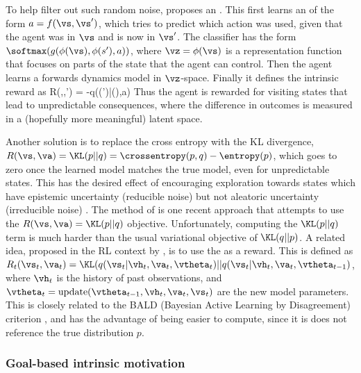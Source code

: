 To help filter out such random noise,
\citep{Pathak2017} proposes an
.
This first learns  an 
of the form $a = f(\vs,\vs')$, which tries
to predict which action was used, given
that the agent was in $\vs$ and is now in $\vs'$.
The classifier has the form
$\softmax(g(\phi(\vs), \phi(s'), a))$,
where $\vz=\phi(\vs)$ is  a representation function
that focuses  on parts of the state that the agent can control.
Then the agent learns a forwards dynamics model
in $\vz$-space.
Finally it defines the intrinsic reward as
\be
R(\vs,\va,\vs') = -\log q(\phi(\vs')|\phi(\vs),a)
\ee
Thus the agent is rewarded for visiting states that lead
to unpredictable consequences,
where the difference in outcomes is measured
in a (hopefully more meaningful) latent space.

Another solution  is to replace the cross entropy
with the KL divergence,
$R(\vs,\va) = \KL(p||q) = \crossentropy(p,q) - \entropy(p)$,
which goes to zero once the learned model matches the true model,
even for unpredictable states.
This has the desired effect of encouraging exploration towards states
which have epistemic uncertainty (reducible noise)
but not aleatoric uncertainty (irreducible noise)
\citep{Mavor-Parker2022}.
The  method of \citep{Jarrett2023}
is one recent approach that attempts to use
the $R(\vs,\va) = \KL(p||q)$ objective.
Unfortunately, computing the $\KL(p||q)$ term is much harder
than the usual variational objective of $\KL(q||p)$.
A related idea,
proposed in the RL context by \citep{Schmidhuber2010},
is to use the  as a reward.
This is defined as
$R_t(\vs_t,\va_t)=\KL(q(\vs_t|\vh_t,\va_t,\vtheta_t)
|| q(\vs_t|\vh_t,\va_t,\vtheta_{t-1})$,
where $\vh_t$ is the history of past observations,
and $\vtheta_t=\text{update}(\vtheta_{t-1}, \vh_t, \va_t, \vs_t)$
are the new model parameters.
This is closely related to the BALD (Bayesian Active Learning by Disagreement)
criterion
\citep{Houlsby2011,Kirsch2019},  and has the advantage
of being  easier to compute, since it is does not reference
the true distribution $p$.




\subsubsection{Goal-based intrinsic motivation}
\label{sec:goExplore}



